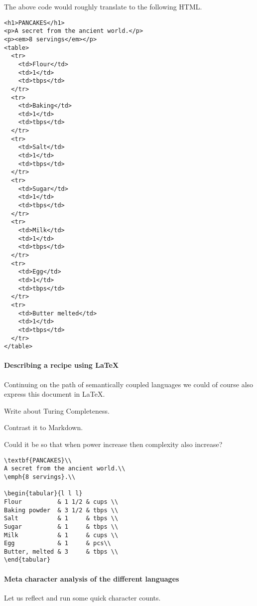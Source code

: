 \documentclass{scrreprt}
\begin{document}
The above code would roughly translate to the following HTML.
\begin{lstlisting}
<h1>PANCAKES</h1>
<p>A secret from the ancient world.</p>
<p><em>8 servings</em></p>
<table>
  <tr>
    <td>Flour</td>
    <td>1</td>
    <td>tbps</td>
  </tr>
  <tr>
    <td>Baking</td>
    <td>1</td>
    <td>tbps</td>
  </tr>
  <tr>
    <td>Salt</td>
    <td>1</td>
    <td>tbps</td>
  </tr>
  <tr>
    <td>Sugar</td>
    <td>1</td>
    <td>tbps</td>
  </tr>
  <tr>
    <td>Milk</td>
    <td>1</td>
    <td>tbps</td>
  </tr>
  <tr>
    <td>Egg</td>
    <td>1</td>
    <td>tbps</td>
  </tr>
  <tr>
    <td>Butter melted</td>
    <td>1</td>
    <td>tbps</td>
  </tr>
</table>
\end{lstlisting}




\paragraph{Describing a recipe using LaTeX}
Continuing on the path of semantically coupled languages we could of course also express this document in LaTeX.

Write about Turing Completeness.

Contrast it to Markdown.

Could it be so that when power increase then complexity also increase?
\begin{lstlisting}
\textbf{PANCAKES}\\
A secret from the ancient world.\\
\emph{8 servings}.\\

\begin{tabular}{l l l}
Flour          & 1 1/2 & cups \\
Baking powder  & 3 1/2 & tbps \\
Salt           & 1     & tbps \\
Sugar          & 1     & tbps \\
Milk           & 1     & cups \\
Egg            & 1     & pcs\\
Butter, melted & 3     & tbps \\
\end{tabular}
\end{lstlisting}



\paragraph{Meta character analysis of the different languages}
Let us reflect and run some quick character counts.
\end{document}
